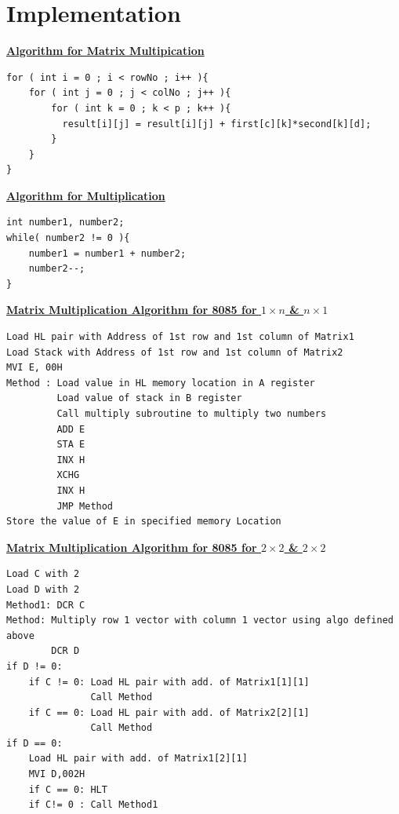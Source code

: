\documentclass[12pt]{article}
\begin{document}




\section{Implementation}\label{implementation}
\textbf{\underline{Algorithm for Matrix Multipication}}
\begin{verbatim}
for ( int i = 0 ; i < rowNo ; i++ ){
	for ( int j = 0 ; j < colNo ; j++ ){
      	for ( int k = 0 ; k < p ; k++ ){
          result[i][j] = result[i][j] + first[c][k]*second[k][d];
        }
    }
}
\end{verbatim}
\textbf{\underline{Algorithm for Multiplication}}
\begin{verbatim}
int number1, number2;
while( number2 != 0 ){
	number1 = number1 + number2;
	number2--;
}
\end{verbatim}
\textbf{\underline{Matrix Multiplication Algorithm for 8085 for $1 \times n$ \& $n \times 1$}}
\begin{verbatim}
Load HL pair with Address of 1st row and 1st column of Matrix1
Load Stack with Address of 1st row and 1st column of Matrix2
MVI E, 00H
Method : Load value in HL memory location in A register
         Load value of stack in B register
         Call multiply subroutine to multiply two numbers
         ADD E
         STA E
         INX H
         XCHG 
         INX H
         JMP Method
Store the value of E in specified memory Location
\end{verbatim}
\textbf{\underline{Matrix Multiplication Algorithm for 8085 for $2 \times 2$ \& $2 \times 2$}}
\begin{verbatim}
Load C with 2
Load D with 2
Method1: DCR C
Method: Multiply row 1 vector with column 1 vector using algo defined above
        DCR D
if D != 0: 
	if C != 0: Load HL pair with add. of Matrix1[1][1]
		       Call Method
	if C == 0: Load HL pair with add. of Matrix2[2][1]
			   Call Method
if D == 0: 
	Load HL pair with add. of Matrix1[2][1]
	MVI D,002H
	if C == 0: HLT
    if C!= 0 : Call Method1
\end{verbatim}

\end{document}
